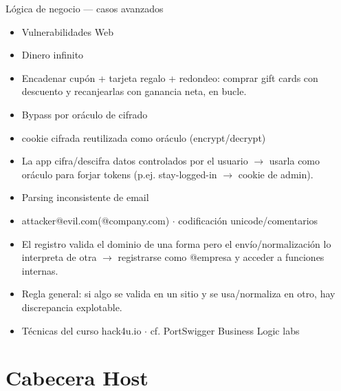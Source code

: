 \documentclass[aspectratio=169,10pt]{beamer}
\begin{document}
\begin{frame}[allowframebreaks]{Lógica de negocio --- casos avanzados}
\small
  \begin{itemize}
  \item Vulnerabilidades Web
  \item Dinero infinito
  \item Encadenar cupón + tarjeta regalo + redondeo: comprar gift cards con descuento y recanjearlas con ganancia neta, en bucle.
  \item Bypass por oráculo de cifrado
  \item cookie cifrada reutilizada como oráculo (encrypt/decrypt)
  \item La app cifra/descifra datos controlados por el usuario $\rightarrow$ usarla como oráculo para forjar tokens (p.ej. stay-logged-in $\rightarrow$ cookie de admin).
  \item Parsing inconsistente de email
  \item attacker@evil.com(@company.com) $\cdot$ codificación unicode/comentarios
  \item El registro valida el dominio de una forma pero el envío/normalización lo interpreta de otra $\rightarrow$ registrarse como @empresa y acceder a funciones internas.
  \item Regla general: si algo se valida en un sitio y se usa/normaliza en otro, hay discrepancia explotable.
  \item Técnicas del curso hack4u.io $\cdot$ cf. PortSwigger Business Logic labs
  \end{itemize}
\end{frame}

\section{Cabecera Host}
\end{document}
